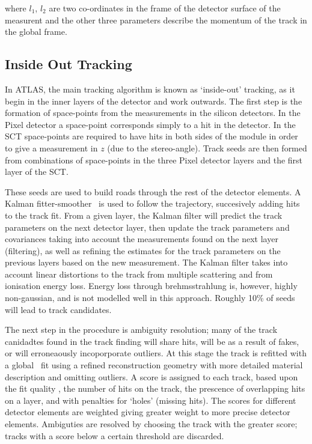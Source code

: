 where $l_{1}$, $l_{2}$ are two co-ordinates in the frame of the detector surface
of the measurent and the other three parameters describe the momentum of the track
in the global frame.

\subsection{Inside Out Tracking}

In ATLAS, the main tracking algorithm is known as `inside-out' tracking, as it
begin in the inner layers of the detector and work outwards. The first step is
the formation of space-points from the measurements in the silicon detectors. In
the Pixel detector a space-point corresponds simply to a hit in the detector. In
the SCT space-points are required to have hits in both sides of the module in
order to give a measurement in $z$ (due to the stereo-angle). Track seeds are
then formed from combinations of space-points in the three Pixel detector layers
and the first layer of the SCT. 

These seeds are used to build roads through the
rest of the detector elements. A Kalman fitter-smoother~\cite{Fruhwirth:1987fm} is used to follow the
trajectory, succesively adding hits to the track fit. From a given layer, the
Kalman filter will predict the track parameters on the next detector layer, then
update the track parameters and covariances taking into account the measurements
found on the next layer (filtering), as well as refining the estimates for the
track parameters on the previous layers based on the new measurement. The Kalman
filter takes into account linear distortions to the track from multiple
scattering and from ionisation energy loss. Energy loss through brehmsstrahlung
is, however, highly non-gaussian, and is not modelled well in this approach. Roughly
10\% of seeds will lead to track candidates.

The next step in the procedure is ambiguity resolution; many of the track
canidadtes found in the track finding will share hits, will be as a result of
fakes, or will erroneaously incoporporate outliers. At this stage the track is
refitted with a global \chisquared\ fit using a refined reconstruction geometry
with more detailed material description and omitting outliers. 
A score is assigned to each track, based upon the fit quality \chisquaredndof,
the number of hits on the track, the prescence of overlapping hits on a layer,
and with
penalties for `holes' (missing hits). The scores for different detector elements
are weighted giving greater weight to more precise detector elements. Ambiguties
are resolved by choosing the track with the greater score; tracks with a score
below a certain threshold are discarded.

